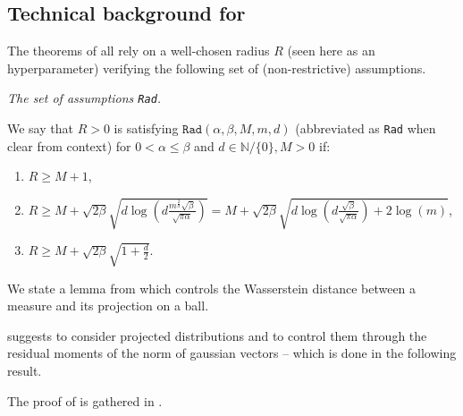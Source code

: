 \begin{noaddcontents}
\subsection{Technical background for }
\label{sec: background_gaussian}

The theorems of  all rely on a well-chosen radius $R$ (seen here as an hyperparameter) verifying the following set of (non-restrictive) assumptions.

\textit{The set of assumptions \texttt{Rad}.}

We say that $R>0$ is satisfying $\texttt{Rad}(\alpha,\beta,M,m,d)$ (abbreviated as \texttt{Rad} when clear from context) for $0<\alpha\leq \beta$ and $d\in\mathbb{N}/\{0\},M>0$ if:

\begin{enumerate}
  \item $R\geq M+1$,
  \item  $R \geq M+\sqrt{2\beta}\sqrt{d \log\left( d\frac{m^{\frac{2}{d}}\sqrt{\beta}}{\sqrt{\pi\alpha}} \right)}
  = M+\sqrt{2\beta}\sqrt{d \log\left( d\frac{\sqrt{\beta}}{\sqrt{\pi\alpha}} \right) +2\log(m)} $,
  \item $R\geq M+ \sqrt{2\beta}\sqrt{1+\frac{d}{2}}$.
\end{enumerate}

We state a lemma from \cite{panaretos2020invitation} which controls the Wasserstein distance between a measure and its projection on a ball.
 suggests to consider projected distributions and to control them through the residual moments of the norm of gaussian vectors -- which is done in the following result.

The proof of  is gathered in .


\end{noaddcontents}
